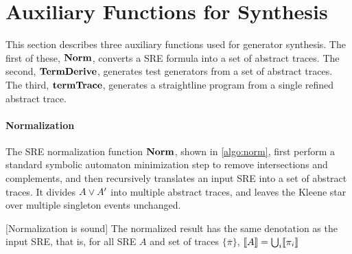 \newpage
\section{Auxiliary Functions for Synthesis}\label{sec:tech:algo}

This section describes three auxiliary functions used for generator
synthesis. The first of these, $\normPlan$, converts a SRE formula
into a set of abstract traces. The second, $\termDerive$, generates test generators from a set of abstract traces. The third,
$\S{termTrace}$, generates a straightline program from a single refined abstract trace.

\begin{algorithm}[t!]
  \caption{Abstract Trace Normalization}
  \label{algo:norm}
\end{algorithm}

\paragraph{Normalization}
The SRE normalization function $\normPlan{}$, shown in
\autoref{algo:norm}, first perform a standard symbolic automaton minimization step to remove intersections and complements, and then recursively translates an input SRE into a set of
abstract traces. It divides $A \lorA A'$ into multiple abstract
traces, and leaves the Kleene star over multiple singleton events
unchanged.

\begin{lemma}\label{lemma:norm-sound}[Normalization is sound]
  The normalized result has the same denotation as the input SRE, that
  is, for all SRE $A$ and set of traces $\{\overline{\pi}\}$, {\small
    $\denot{A} = \bigcup_{i} \denot{\pi_i}$}
\end{lemma}


